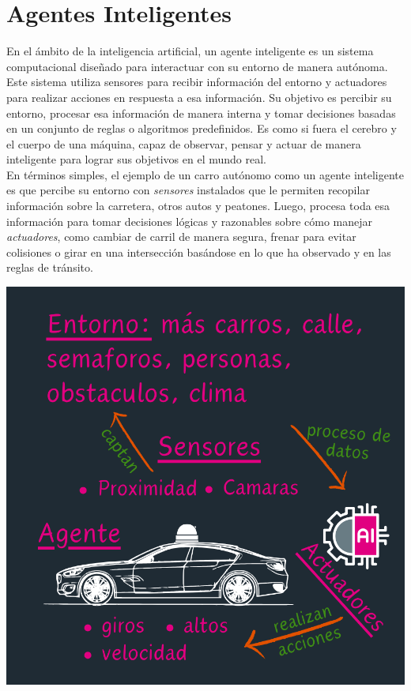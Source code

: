 \section{Agentes Inteligentes}

En el ámbito de la inteligencia artificial, un agente inteligente es un sistema computacional 
diseñado para interactuar con su entorno de manera autónoma. Este sistema utiliza sensores 
para recibir información del entorno y actuadores para realizar acciones en respuesta a esa 
información. Su objetivo es percibir su entorno, procesar esa información de manera interna y 
tomar decisiones basadas en un conjunto de reglas o algoritmos predefinidos. Es como si fuera 
el cerebro y el cuerpo de una máquina, capaz de observar, pensar y actuar de manera inteligente 
para lograr sus objetivos en el mundo real.\\


En términos simples, el ejemplo de un carro autónomo como un agente inteligente es que percibe su
entorno con \textit{sensores} instalados que le permiten recopilar información sobre la carretera,
otros autos y peatones. Luego, procesa toda esa información para tomar decisiones lógicas y 
razonables sobre cómo manejar \textit{actuadores}, como cambiar de carril de manera segura, 
frenar para evitar colisiones o girar en una intersección basándose en lo que ha observado y en 
las reglas de tránsito. 

\begin{center}
    \includegraphics[scale = .6]{assets/imagenes/agenInte.png}
\end{center}

